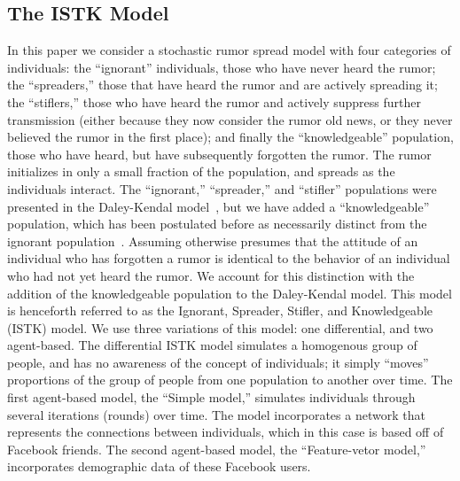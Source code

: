 \subsection{The ISTK Model}
\label{subsec:istk}

In this paper we consider a stochastic rumor spread model with four categories of individuals: the ``ignorant'' individuals, those who have never heard the rumor; the ``spreaders,'' those that have heard the rumor and are actively spreading it; the ``stiflers,'' those who have heard the rumor and actively suppress further transmission (either because they now consider the rumor old news, or they never believed the rumor in the first place); and finally the ``knowledgeable'' population, those who have heard, but have subsequently forgotten the rumor.
The rumor initializes in only a small fraction of the population, and spreads as the individuals interact.
The ``ignorant,'' ``spreader,'' and ``stifler'' populations were presented in the Daley-Kendal model~\cite{daley-1965}, but we have added a ``knowledgeable'' population, which has been postulated before as necessarily distinct from the ignorant population~\cite{zhao-2012, zhao-2011}.
Assuming otherwise presumes that the attitude of an individual who has forgotten a rumor is identical to the behavior of an individual who had not yet heard the rumor.
We account for this distinction with the addition of the knowledgeable population to the Daley-Kendal model.
This model is henceforth referred to as the Ignorant, Spreader, Stifler, and Knowledgeable (ISTK) model.
We use three variations of this model: one differential, and two agent-based.
The differential ISTK model simulates a homogenous group of people, and has no awareness of the concept of individuals; it simply ``moves'' proportions of the group of people from one population to another over time.
The first agent-based model, the ``Simple model,'' simulates individuals through several iterations (rounds) over time.
The model incorporates a network that represents the connections between individuals, which in this case is based off of Facebook friends.
The second agent-based model, the ``Feature-vetor model,'' incorporates demographic data of these Facebook users.

